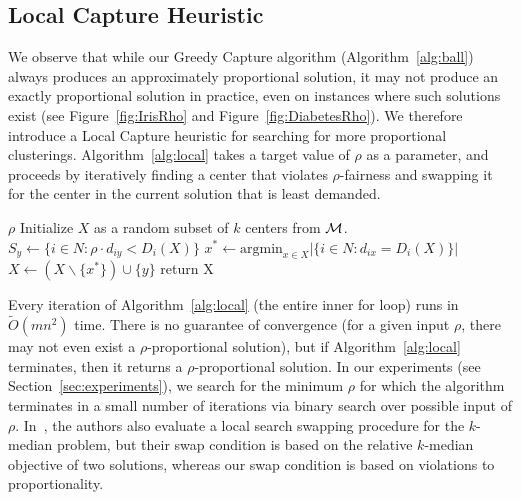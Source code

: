 \subsection{Local Capture Heuristic}
We observe that while our Greedy Capture algorithm (Algorithm~\ref{alg:ball}) always produces an approximately proportional solution, it may not produce an exactly proportional solution in practice, even on instances where such solutions exist (see Figure~\ref{fig:IrisRho} and Figure~\ref{fig:DiabetesRho}). We therefore introduce a Local Capture heuristic for searching for more proportional clusterings. Algorithm~\ref{alg:local} takes a target value of $\rho$ as a parameter, and proceeds by iteratively finding a center that violates $\rho$-fairness and swapping it for the center in the current solution that is least demanded.

\begin{algorithm}
\begin{algorithmic}[1]
\caption{Local Capture Heuristic}
\label{alg:local}
	\INPUT $\rho$
	\STATE Initialize $X$ as a random subset of $k$ centers from $\mathcal{M}$.
	\REPEAT
		\STATE $S_y \gets \{i \in N: \rho \cdot d_{iy} < D_i(X)\}$
			\STATE $x^* \gets \mbox{argmin}_{x \in X} | \{i \in N: d_{ix} = D_i(X) \}|$
			\STATE $X \gets (X \backslash \{x^*\}) \cup \{y\}$
		\ENDIF
	\ENDFOR
	\STATE return X
\end{algorithmic}
\end{algorithm}

Every iteration of Algorithm~\ref{alg:local} (the entire inner for loop) runs in $\tilde{O}(mn^2)$ time. There is no guarantee of convergence (for a given input $\rho$, there may not even exist a $\rho$-proportional solution), but if Algorithm~\ref{alg:local} terminates, then it returns a $\rho$-proportional solution. In our experiments (see Section~\ref{sec:experiments}), we search for the minimum $\rho$ for which the algorithm terminates in a small number of iterations via binary search over possible input of $\rho$. In~\cite{kmedians}, the authors also evaluate a local search swapping procedure for the $k$-median problem, but their swap condition is based on the relative $k$-median objective of two solutions, whereas our swap condition is based on violations to proportionality.